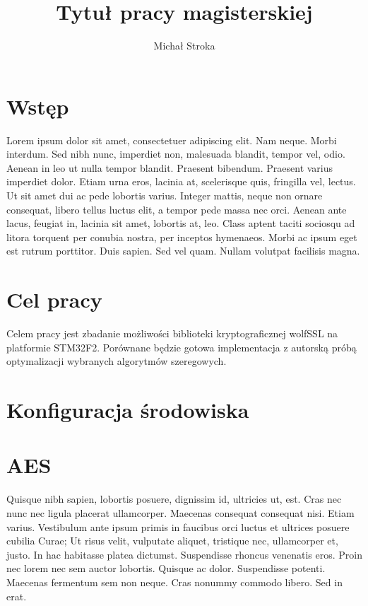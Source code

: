 \documentclass[printmode]{mgr}
\title{Tytuł pracy magisterskiej}
\author{Michał Stroka}
\begin{document}


\tableofcontents %

\chapter{Wstęp}
Lorem ipsum dolor sit amet, consectetuer adipiscing elit. Nam
neque. Morbi interdum. Sed nibh nunc, imperdiet non, malesuada
blandit, tempor vel, odio. Aenean in leo ut nulla tempor
blandit. Praesent bibendum. Praesent varius imperdiet dolor. Etiam
urna eros, lacinia at, scelerisque quis, fringilla vel, lectus. Ut sit
amet dui ac pede lobortis varius. Integer mattis, neque non ornare
consequat, libero tellus luctus elit, a tempor pede massa nec
orci. Aenean ante lacus, feugiat in, lacinia sit amet, lobortis at,
leo. Class aptent taciti sociosqu ad litora torquent per conubia
nostra, per inceptos hymenaeos. Morbi ac ipsum eget est rutrum
porttitor. Duis sapien. Sed vel quam. Nullam volutpat facilisis magna.

\chapter{Cel pracy}

Celem pracy jest zbadanie możliwości biblioteki kryptograficznej wolfSSL na platformie STM32F2.
Porównane będzie gotowa implementacja z autorską próbą optymalizacji wybranych algorytmów szeregowych.

\chapter{Konfiguracja środowiska}

\chapter{AES}
Quisque nibh sapien, lobortis posuere, dignissim id, ultricies ut,
est. Cras nec nunc nec ligula placerat ullamcorper. Maecenas consequat
consequat nisi. Etiam varius. Vestibulum ante ipsum primis in faucibus
orci luctus et ultrices posuere cubilia Curae; Ut risus velit,
vulputate aliquet, tristique nec, ullamcorper et, justo. In hac
habitasse platea dictumst. Suspendisse rhoncus venenatis eros. Proin
nec lorem nec sem auctor lobortis. Quisque ac dolor. Suspendisse
potenti. Maecenas fermentum sem non neque. Cras nonummy commodo
libero. Sed in erat.
\end{document}
